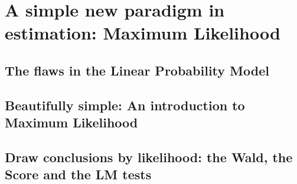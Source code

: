 \documentclass[11pt,fullpage]{book}
\begin{document}
\part{A simple new paradigm in estimation: Maximum Likelihood}
\chapter{The flaws in the Linear Probability Model}
\chapter{Beautifully simple: An introduction to Maximum Likelihood}
\chapter{Draw conclusions by likelihood: the Wald, the Score and the LM tests}





\end{document}

